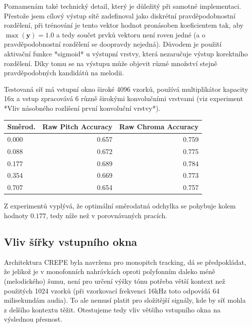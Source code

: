 Poznamenám také technický detail, který je důležitý při samotné implementaci. Přestože jsem cílový výstup sítě zadefinoval jako diskrétní pravděpodobnostní rozdělení, při trénování je tento vektor hodnot pronásoben koeficientem tak, aby $\max(\mathbf{y}) = 1.0$ a tedy součet prvků vektoru není roven jedné (a o pravděpodobnostní rozdělení se doopravdy nejedná). Důvodem je použití aktivační funkce *sigmoid* u výstupní vrstvy, která nezaručuje výstup korektního rozdělení. Díky tomu se na výstupu může objevit různé množství stejně pravděpodobných kandidátů na melodii.

Testovaná síť má vstupní okno široké 4096 vzorků, používá multiplikátor kapacity 16x a vstup zpracovává 6 různě širokými konvolučními vrstvami (viz experiment *Vliv násobného rozlišení první konvoluční vrstvy*).

    \begin{tabular}{lrr}
    \toprule
    Směrod. &  Raw Pitch Accuracy &  Raw Chroma Accuracy \\
    \midrule
    0.000   &               0.657 &                0.759 \\
    0.088   &               0.672 &                0.775 \\
    0.177   &               0.689 &                0.784 \\
    0.354   &               0.669 &                0.773 \\
    0.707   &               0.654 &                0.757 \\
    \bottomrule
    \end{tabular}

Z experimentů vyplývá, že optimální směrodatná odchylka se pohybuje kolem hodnoty $0.177$, tedy níže než v porovnávaných pracích. 


\subsection{Vliv šířky vstupního okna}

Architektura CREPE byla navržena pro monopitch tracking, dá se předpokládat, že jelikož je v monofonních nahrávkách oproti polyfonním daleko méně (melodického) šumu, není pro určení výšky tónu potřeba větší kontext než použitých 1024 vzorků (při vzorkovací frekvenci 16kHz toto odpovídá 64 milisekundám audia). To ale nemusí platit pro složitější signály, kde by síť mohla z delšího kontextu těžit. Otestujeme tedy vliv většího vstupního okna na výslednou přesnost.


